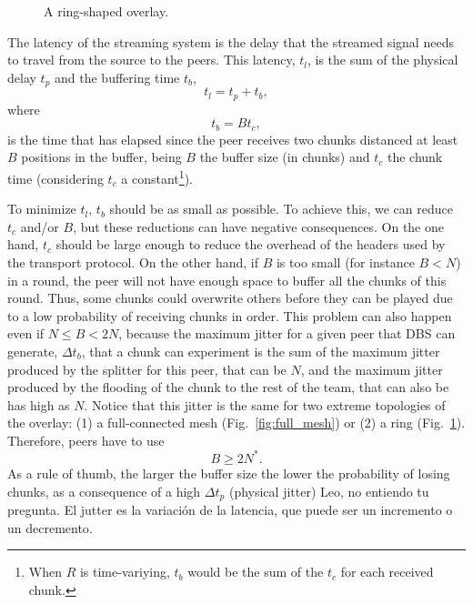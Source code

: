

\label{sec:latency}

\begin{figure}
  \centering
  \vbox{}
  \caption{A ring-shaped overlay.}
  \label{fig:ring}
\end{figure}

The latency of the streaming system is the delay that the streamed
signal needs to travel from the source to the peers. This
latency, $t_l$, is the sum of the physical delay $t_p$ and the
buffering time $t_b$,
\begin{equation}
  \label{eq:t_l}
  t_l = t_p + t_b,
\end{equation}
where
\begin{equation}
  \label{eq:t_b}
  t_b = Bt_c,
\end{equation}
is the time that has elapsed since the peer receives two chunks
distanced at least $B$ positions in the buffer, being $B$ the buffer
size (in chunks) and $t_c$ the chunk time (considering $t_c$ a
constant\footnote{When $R$ is time-variying, $t_b$ would be the sum of
  the $t_c$ for each received chunk.}).

To minimize $t_l$, $t_b$ should be as small as possible. To achieve
this, we can reduce $t_c$ and/or $B$, but these reductions can have
negative consequences. On the one hand, $t_c$ should be large enough
to reduce the overhead of the headers used by the transport
protocol. On the other hand, if $B$ is too small (for instance $B<N$)
in a round, the peer will not have enough space to buffer all the
chunks of this round. Thus, some chunks could overwrite others before
they can be played due to a low probability of receiving chunks in
order. This problem can also happen even if $N\leq B<2N$, because the
maximum jitter for a given peer that DBS can generate, $\Delta t_b$,
that a chunk can experiment is the sum of the maximum jitter produced
by the splitter for this peer, that can be $N$, and the maximum jitter
produced by the flooding of the chunk to the rest of the team, that
can also be has high as $N$. Notice that this jitter is the same for
two extreme topologies of the overlay: (1) a full-connected mesh
(Fig.~\ref{fig:full_mesh}) or (2) a ring
(Fig.~\ref{fig:ring}). Therefore, peers have to use
\begin{equation}
  \label{eq:minimum_B}
  B\ge 2N^*.
\end{equation}
As a rule of thumb, the larger the buffer size the lower the
probability of losing chunks, as a consequence of a high $\Delta t_p$
(physical jitter)  {\color{red}
  Leo, no entiendo tu pregunta. El jutter es la variación de la
  latencia, que puede ser un incremento o un decremento}.

